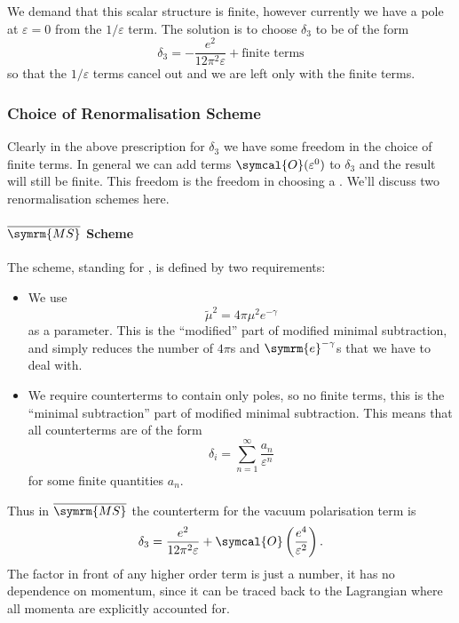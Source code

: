 \documentclass[fleqn]{NotesClass}
\newcommand{\MSbar}{\ensuremath{\overline{\symrm{MS}}}}
\newcommand{\e}{\symrm{e}}
\newcommand{\order}{\symcal{O}}
\begin{document}
    We demand that this scalar structure is finite, however currently we have a pole at \(\varepsilon = 0\) from the \(1/\varepsilon\) term.
    The solution is to choose \(\delta_3\) to be of the form
    \begin{equation}
        \delta_3 = -\frac{e^2}{12\pi^2 \varepsilon} + \text{finite terms}
    \end{equation}
    so that the \(1/\varepsilon\) terms cancel out and we are left only with the finite terms.
    
    \subsubsection{Choice of Renormalisation Scheme}
    Clearly in the above prescription for \(\delta_3\) we have some freedom in the choice of finite terms.
    In general we can add terms \(\order(\varepsilon^0)\) to \(\delta_3\) and the result will still be finite.
    This freedom is the freedom in choosing a .
    We'll discuss two renormalisation schemes here.
    
    \paragraph{\MSbar{} Scheme}
    The \define{\MSbar}\index{MS@\MSbar} scheme, standing for , is defined by two requirements:
    \begin{itemize}
        \item We use
        \begin{equation}
            \tilde{\mu}^2 = 4\pi \mu^2 e^{-\gamma}
        \end{equation}
        as a parameter.
        This is the \enquote{modified} part of modified minimal subtraction, and simply reduces the number of \(4\pi\)s and \(\e^{-\gamma}\)s that we have to deal with.
        \item We require counterterms to contain only poles, so no finite terms, this is the \enquote{minimal subtraction} part of modified minimal subtraction.
        This means that all counterterms are of the form
        \begin{equation}
            \delta_i = \sum_{n = 1}^{\infty} \frac{a_n}{\varepsilon^n}
        \end{equation}
        for some finite quantities \(a_n\).
    \end{itemize}
    Thus in \MSbar{} the counterterm for the vacuum polarisation term is
    \begin{equation}
        \delta_3 = \frac{e^2}{12\pi^2\varepsilon} + \order\left( \frac{e^4}{\varepsilon^2} \right).
    \end{equation}
    The factor in front of any higher order term is just a number, it has no dependence on momentum, since it can be traced back to the Lagrangian where all momenta are explicitly accounted for.
    
\end{document}
